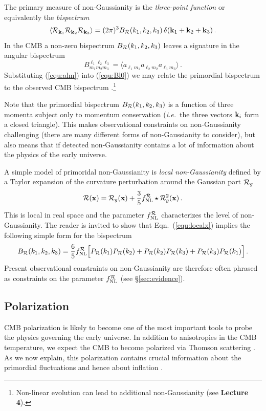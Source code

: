\documentclass[12pt,letterpaper,rotate]{article}
\def\beq{\begin{equation}}
\def\eeq{\end{equation}}
\def\R{{\cal R}}
\begin{document}
{The primary measure of non-Gaussianity is the {\it three-point function} or equivalently the {\it bispectrum}
\beq
 \langle \R_{{\bf k}_1} \R_{{\bf k}_2} \R_{{\bf k}_3}\rangle = (2\pi)^3 B_\R(k_1,k_2,k_3)\, \delta({\bf k}_1 + {\bf k}_2+{\bf k}_3)\, .
\eeq
In the CMB a non-zero bispectrum $B_\R(k_1, k_2, k_3)$ leaves a signature in the angular bispectrum
\beq
\label{equ:Bl0}
B^{\ell_1 \ell_2 \ell_3}_{m_1 m_2 m_3} = \langle a_{\ell_1 m_1} a_{\ell_2 m_2} a_{\ell_3 m_3}\rangle \, .\eeq
Substituting (\ref{equ:alm}) into (\ref{equ:Bl0}) we may relate the primordial bispectrum to the observed CMB bispectrum \cite{NGreview}.\footnote{Non-linear evolution can lead to additional non-Gaussianity (see {\bf Lecture 4}).}

Note that the primordial bispectrum $B_\R(k_1,k_2,k_3)$ is a function of three momenta subject only to momentum conservation ({\it i.e.}~the three vectors ${\bf k}_i$ form a closed triangle).
This makes observational constraints on non-Gaussianity challenging (there are many different forms of non-Gaussianity to consider), but also means that if detected non-Gaussianity contains a lot of information about the physics of the early universe.

A simple model of primoridal non-Gaussianity is {\it local non-Gaussianity} defined by a Taylor expansion of the curvature perturbation around the Gaussian part $\R_g$
\beq
\label{equ:localx}
\R({\bf x}) = \R_g({\bf x}) + \frac{3}{5} f_{\rm NL}^\R \star \R_g^2({\bf x})\, .
\eeq
This is local in real space and the parameter $f_{\rm NL}^\R$ characterizes the level of non-Gaussianity.
The reader is invited to show that Eqn.~(\ref{equ:localx}) implies the following simple form for the bispectrum
\beq
B_\R(k_1,k_2,k_3) = \frac{6}{5} f_{\rm NL}^\R \Bigl[ P_\R(k_1) P_\R(k_2) + P_\R(k_2) P_\R(k_3) + P_\R(k_3) P_\R(k_1)\Bigr]\, .
\eeq
Present observational constraints on non-Gaussianity are therefore often phrased as constraints on the parameter $f_{\rm NL}^\R$ (see \S\ref{sec:evidence}).

\subsection{Polarization}

CMB polarization is likely to become one of the most important tools to probe the physics governing the early universe.
In addition to anisotropies in the CMB temperature, we expect the CMB to become polarized via Thomson scattering \cite{Dodelson}. As we now explain, this polarization contains crucial information about the primordial fluctuations and hence about inflation \cite{WhitePaper}.

}
\end{document}
